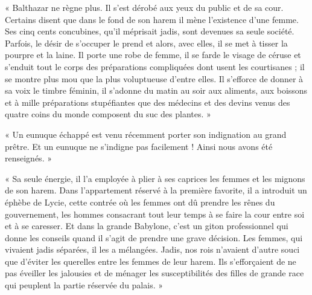 \documentclass[a4paper, 11pt, oneside, polutonikogreek, french]{article}
\begin{document}
« Balthazar ne règne plus. Il s'est dérobé aux yeux du public et de sa cour. Certains disent que dans le fond de son harem il mène l'existence d'une femme. Ses cinq cents concubines, qu'il méprisait jadis, sont devenues sa seule société. Parfois, le désir de s'occuper le prend et alors, avec elles, il se met à tisser la pourpre et la laine. Il porte une robe de femme, il se farde le visage de céruse et s'enduit tout le corps des préparations compliquées dont usent les courtisanes ; il se montre plus mou que la plus voluptueuse d'entre elles. Il s'efforce de donner à sa voix le timbre féminin, il s'adonne du matin au soir aux aliments, aux boissons et à mille préparations stupéfiantes que des médecins et des devins venus des quatre coins du monde composent du suc des plantes. »

\bigskip
\centerline{\EightStarTaper}
\centerline{\EightStarTaper\EightStarTaper}
\bigskip

« Un eunuque échappé est venu récemment porter son indignation au grand prêtre. Et un eunuque ne s'indigne pas facilement ! Ainsi nous avons été renseignés. »

« Sa seule énergie, il l'a employée à plier à ses caprices les femmes et les mignons de son harem. Dans l'appartement réservé à la première favorite, il a introduit un éphèbe de Lycie, cette contrée où les femmes ont dû prendre les rênes du gouvernement, les hommes consacrant tout leur temps à se faire la cour entre soi et à se caresser. Et dans la grande Babylone, c'est un giton professionnel qui donne les conseils quand il s'agit de prendre une grave décision. Les femmes, qui vivaient jadis séparées, il les a mélangées. Jadis, nos rois n'avaient d'autre souci que d'éviter les querelles entre les femmes de leur harem. Ils s'efforçaient de ne pas éveiller les jalousies et de ménager les susceptibilités des filles de grande race qui peuplent la partie réservée du palais. »

\bigskip
\centerline{\EightStarTaper}
\centerline{\EightStarTaper\EightStarTaper}
\bigskip
\end{document}

